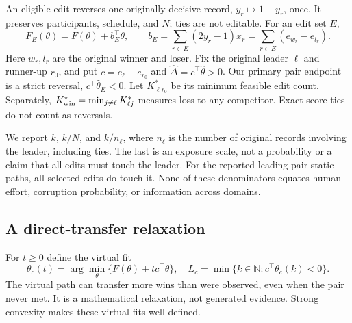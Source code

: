 \documentclass{article}
\begin{document}
An eligible edit reverses one originally decisive record, $y_r\mapsto1-y_r$, once. It preserves participants, schedule, and $N$; ties are not editable. For an edit set $E$,
\begin{equation}
 F_E(\theta)=F(\theta)+b_E^\top\theta,\qquad
 b_E=\sum_{r\in E}(2y_r-1)x_r
     =\sum_{r\in E}(e_{w_r}-e_{l_r}). \label{eq:edit}
\end{equation}
Here $w_r,l_r$ are the original winner and loser. Fix the original leader $\ell$ and runner-up $r_0$, and put $c=e_\ell-e_{r_0}$ and $\hat\Delta=c^\top\hat\theta>0$. Our primary pair endpoint is a strict reversal, $c^\top\hat\theta_E<0$. Let $K^*_{\ell r_0}$ be its minimum feasible edit count. Separately, $K^*_{\rm win}=\min_{j\ne\ell}K^*_{\ell j}$ measures loss to any competitor. Exact score ties do not count as reversals.

We report $k$, $k/N$, and $k/n_\ell$, where $n_\ell$ is the number of original records involving the leader, including ties. The last is an exposure scale, not a probability or a claim that all edits must touch the leader. For the reported leading-pair static paths, all selected edits do touch it. None of these denominators equates human effort, corruption probability, or information across domains.

\subsection{A direct-transfer relaxation}
For $t\ge0$ define the virtual fit
\begin{equation}
 \theta_c(t)=\arg\min_\theta\{F(\theta)+t c^\top\theta\},\quad
 L_c=\min\{k\in\mathbb N:c^\top\theta_c(k)<0\}. \label{eq:virtual}
\end{equation}
The virtual path can transfer more wins than were observed, even when the pair never met. It is a mathematical relaxation, not generated evidence. Strong convexity makes these virtual fits well-defined.
\end{document}
